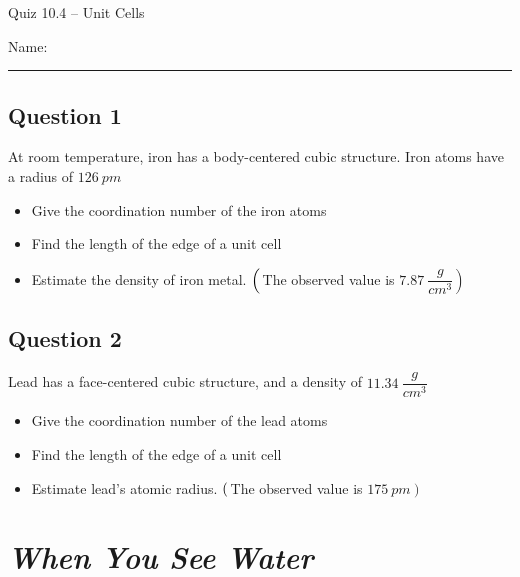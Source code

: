 \documentclass[11pt, letterpaper]{memoir}
\begin{document}
	\begin{center}
		{\large	Quiz 10.4 -- Unit Cells}
	\end{center}
	{\large Name: \rule[-1mm]{4in}{.1pt} 
	
	\subsection*{Question 1}
	At room temperature, iron has a body-centered cubic structure. Iron atoms have a radius of $126~pm$
	\begin{itemize}
		\item Give the coordination number of the iron atoms
		\item Find the length of the edge of a unit cell
		\item Estimate the density of iron metal. $\left(\vphantom{\dfrac{g}{cm^3}}\right.$The observed value is $\left.7.87~\dfrac{g}{cm^3}\right)$
	\end{itemize}
	
	\vspace{13em}
	\subsection*{Question 2}
	Lead has a face-centered cubic structure, and a density of $11.34~\dfrac{g}{cm^3}$
	\begin{itemize}
		\item Give the coordination number of the lead atoms
		\item Find the length of the edge of a unit cell
		\item Estimate lead's atomic radius. $\left(\vphantom{pm}\right.$The observed value is $\left.175~pm\right)$
	\end{itemize}

	\newpage
	\pagestyle{empty}
	\addtocounter{page}{-1}
  \section*{\emph{When You See Water}}
}
\end{document}
